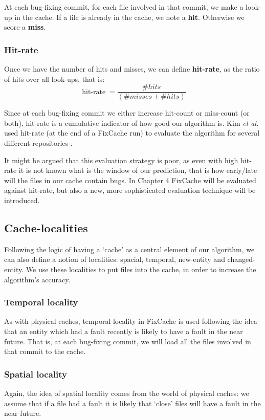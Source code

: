 \documentclass[12pt,twoside,notitlepage]{report}
\newcommand{\fxch}{FixCache}
\newcommand{\etal}{\textit{et al.}}
\begin{document}
At each bug-fixing commit, for each file involved in that commit, we make a look-up in the cache. If a file is already in the cache, we note a \textbf{hit}. Otherwise we score a \textbf{miss}.
\subsubsection*{Hit-rate}
Once we have the number of hits and misses, we can define \textbf{hit-rate}, as the ratio of hits over all look-ups, that is:
\vspace{0.2in}
\[
	\operatorname{hit-rate} = \frac{\#hits}{(\#misses + \#hits)}
\]

\vspace{0.2in}

Since at each bug-fixing commit we either increase hit-count or miss-count (or both), hit-rate is a cumulative indicator of how good our algorithm is. Kim \etal{} used hit-rate (at the end of a \fxch{} run) to evaluate the algorithm for several different repositories \cite{FixCache}.

It might be argued that this evaluation strategy is poor, as even with high hit-rate it is not known what is the window of our prediction, that is how early/late will the files in our cache contain bugs. In Chapter 4 \fxch{} will be evaluated against hit-rate, but also a new, more sophisticated evaluation technique will be introduced.
\subsection{Cache-localities}
Following the logic of having a `cache' as a central element of our algorithm, we can also define a notion of localities: spacial, temporal, new-entity and changed-entity. We use these localities to put files into the cache, in order to increase the algorithm's accuracy.
\subsubsection{Temporal locality}
As with physical caches, temporal locality in \fxch{} is used following the idea that an entity which had a fault recently is likely to have a fault in the near future. That is, at each bug-fixing commit, we will load all the files involved in that commit to the cache.
\subsubsection{Spatial locality}
Again, the idea of spatial locality comes from the world of physical caches: we assume that if a file had a fault it is likely that `close' files will have a fault in the near future.
\end{document}
